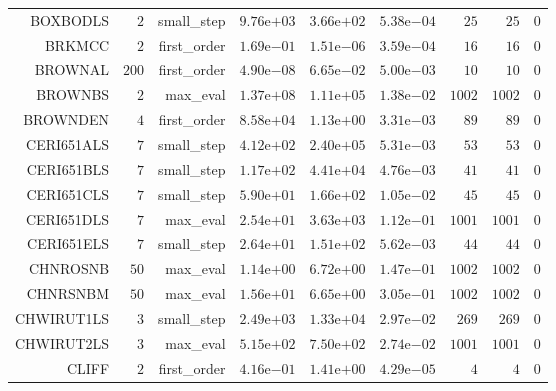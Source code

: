 \begin{longtable}{rrrrrrrrr}
BOXBODLS & \(     2\) & small\_step & \( 9.76\)e\(+03\) & \( 3.66\)e\(+02\) & \( 5.38\)e\(-04\) & \(    25\) & \(    25\) & \(     0\) \\
BRKMCC & \(     2\) & first\_order & \( 1.69\)e\(-01\) & \( 1.51\)e\(-06\) & \( 3.59\)e\(-04\) & \(    16\) & \(    16\) & \(     0\) \\
BROWNAL & \(   200\) & first\_order & \( 4.90\)e\(-08\) & \( 6.65\)e\(-02\) & \( 5.00\)e\(-03\) & \(    10\) & \(    10\) & \(     0\) \\
BROWNBS & \(     2\) & max\_eval & \( 1.37\)e\(+08\) & \( 1.11\)e\(+05\) & \( 1.38\)e\(-02\) & \(  1002\) & \(  1002\) & \(     0\) \\
BROWNDEN & \(     4\) & first\_order & \( 8.58\)e\(+04\) & \( 1.13\)e\(+00\) & \( 3.31\)e\(-03\) & \(    89\) & \(    89\) & \(     0\) \\
CERI651ALS & \(     7\) & small\_step & \( 4.12\)e\(+02\) & \( 2.40\)e\(+05\) & \( 5.31\)e\(-03\) & \(    53\) & \(    53\) & \(     0\) \\
CERI651BLS & \(     7\) & small\_step & \( 1.17\)e\(+02\) & \( 4.41\)e\(+04\) & \( 4.76\)e\(-03\) & \(    41\) & \(    41\) & \(     0\) \\
CERI651CLS & \(     7\) & small\_step & \( 5.90\)e\(+01\) & \( 1.66\)e\(+02\) & \( 1.05\)e\(-02\) & \(    45\) & \(    45\) & \(     0\) \\
CERI651DLS & \(     7\) & max\_eval & \( 2.54\)e\(+01\) & \( 3.63\)e\(+03\) & \( 1.12\)e\(-01\) & \(  1001\) & \(  1001\) & \(     0\) \\
CERI651ELS & \(     7\) & small\_step & \( 2.64\)e\(+01\) & \( 1.51\)e\(+02\) & \( 5.62\)e\(-03\) & \(    44\) & \(    44\) & \(     0\) \\
CHNROSNB & \(    50\) & max\_eval & \( 1.14\)e\(+00\) & \( 6.72\)e\(+00\) & \( 1.47\)e\(-01\) & \(  1002\) & \(  1002\) & \(     0\) \\
CHNRSNBM & \(    50\) & max\_eval & \( 1.56\)e\(+01\) & \( 6.65\)e\(+00\) & \( 3.05\)e\(-01\) & \(  1002\) & \(  1002\) & \(     0\) \\
CHWIRUT1LS & \(     3\) & small\_step & \( 2.49\)e\(+03\) & \( 1.33\)e\(+04\) & \( 2.97\)e\(-02\) & \(   269\) & \(   269\) & \(     0\) \\
CHWIRUT2LS & \(     3\) & max\_eval & \( 5.15\)e\(+02\) & \( 7.50\)e\(+02\) & \( 2.74\)e\(-02\) & \(  1001\) & \(  1001\) & \(     0\) \\
CLIFF & \(     2\) & first\_order & \( 4.16\)e\(-01\) & \( 1.41\)e\(+00\) & \( 4.29\)e\(-05\) & \(     4\) & \(     4\) & \(     0\) \\

\end{longtable}
